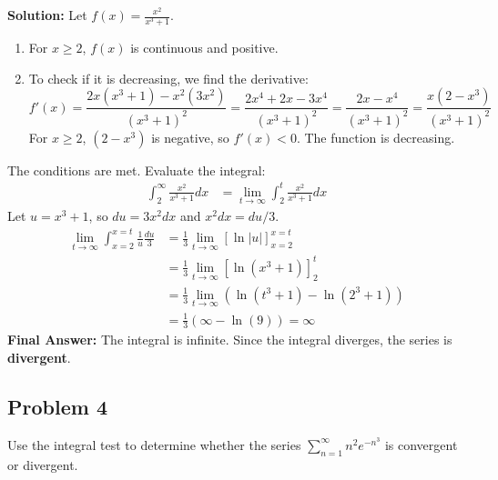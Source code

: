\documentclass{article}
\begin{document}
\textbf{Solution:}
Let $f(x) = \frac{x^2}{x^3+1}$.
\begin{enumerate}
    \item For $x \ge 2$, $f(x)$ is continuous and positive.
    \item To check if it is decreasing, we find the derivative:
    \[ f'(x) = \frac{2x(x^3+1) - x^2(3x^2)}{(x^3+1)^2} = \frac{2x^4+2x-3x^4}{(x^3+1)^2} = \frac{2x-x^4}{(x^3+1)^2} = \frac{x(2-x^3)}{(x^3+1)^2} \]
    For $x \ge 2$, $(2-x^3)$ is negative, so $f'(x) < 0$. The function is decreasing.
\end{enumerate}
The conditions are met. Evaluate the integral:
\begin{align*}
    \int_2^\infty \frac{x^2}{x^3+1} dx &= \lim_{t \to \infty} \int_2^t \frac{x^2}{x^3+1} dx
\end{align*}
Let $u = x^3+1$, so $du = 3x^2dx$ and $x^2dx = du/3$.
\begin{align*}
    \lim_{t \to \infty} \int_{x=2}^{x=t} \frac{1}{u} \frac{du}{3} &= \frac{1}{3} \lim_{t \to \infty} \left[ \ln|u| \right]_{x=2}^{x=t} \\
    &= \frac{1}{3} \lim_{t \to \infty} \left[ \ln(x^3+1) \right]_2^t \\
    &= \frac{1}{3} \lim_{t \to \infty} (\ln(t^3+1) - \ln(2^3+1)) \\
    &= \frac{1}{3} (\infty - \ln(9)) = \infty
\end{align*}
\textbf{Final Answer:} The integral is infinite. Since the integral diverges, the series is \textbf{divergent}.

\subsection*{Problem 4}
Use the integral test to determine whether the series $\sum_{n=1}^{\infty} n^2 e^{-n^3}$ is convergent or divergent.
\end{document}
